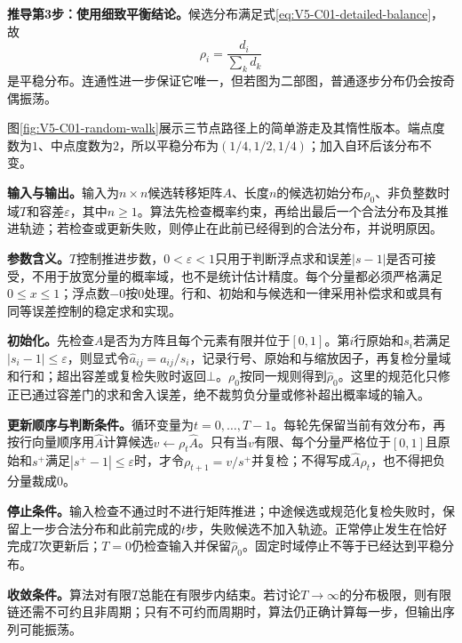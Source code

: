 \textbf{推导第3步：使用细致平衡结论。}候选分布满足式\eqref{eq:V5-C01-detailed-balance}，故
\begin{equation}\label{eq:V5-C01-degree-stationary}
\rho_i=\frac{d_i}{\sum_kd_k}
\end{equation}
是平稳分布。连通性进一步保证它唯一，但若图为二部图，普通逐步分布仍会按奇偶振荡。

图\ref{fig:V5-C01-random-walk}展示三节点路径上的简单游走及其惰性版本。端点度数为$1$、中点度数为$2$，所以平稳分布为$(1/4,\allowbreak 1/2,\allowbreak 1/4)$；加入自环后该分布不变。


\label{struct:V5-C01-CH19}
\label{struct:V5-C01-CH20}
\textbf{输入与输出。}输入为$n\times n$候选转移矩阵$A$、长度$n$的候选初始分布$\rho_0$、非负整数时域$T$和容差$\varepsilon$，其中$n\ge1$。算法先检查概率约束，再给出最后一个合法分布及其推进轨迹；若检查或更新失败，则停止在此前已经得到的合法分布，并说明原因。

\label{struct:V5-C01-CH21}
\textbf{参数含义。}$T$控制推进步数，$0<\varepsilon<1$只用于判断浮点求和误差$|s-1|$是否可接受，不用于放宽分量的概率域，也不是统计估计精度。每个分量都必须严格满足$0\le x\le1$；浮点数$-0$按$0$处理。行和、初始和与候选和一律采用补偿求和或具有同等误差控制的稳定求和实现。

\label{struct:V5-C01-CH22}
\textbf{初始化。}先检查$A$是否为方阵且每个元素有限并位于$[0,1]$。第$i$行原始和$s_i$若满足$|s_i-1|\le\varepsilon$，则显式令$\widehat a_{ij}=a_{ij}/s_i$，记录行号、原始和与缩放因子，再复检分量域和行和；超出容差或复检失败时返回$\bot$。$\rho_0$按同一规则得到$\widehat\rho_0$。这里的规范化只修正已通过容差门的求和舍入误差，绝不裁剪负分量或修补超出概率域的输入。

\label{struct:V5-C01-CH23}
\textbf{更新顺序与判断条件。}循环变量为$t=0,\ldots,T-1$。每轮先保留当前有效分布，再按行向量顺序用$\widehat A$计算候选$v\leftarrow\rho_t\widehat A$。只有当$v$有限、每个分量严格位于$[0,1]$且原始和$s^+$满足$|s^+-1|\le\varepsilon$时，才令$\rho_{t+1}=v/s^+$并复检；不得写成$\widehat A\rho_t$，也不得把负分量裁成$0$。

\label{struct:V5-C01-CH24}
\textbf{停止条件。}输入检查不通过时不进行矩阵推进；中途候选或规范化复检失败时，保留上一步合法分布和此前完成的$t$步，失败候选不加入轨迹。正常停止发生在恰好完成$T$次更新后；$T=0$仍检查输入并保留$\widehat\rho_0$。固定时域停止不等于已经达到平稳分布。

\label{struct:V5-C01-CH25}
\textbf{收敛条件。}算法对有限$T$总能在有限步内结束。若讨论$T\to\infty$的分布极限，则有限链还需不可约且非周期；只有不可约而周期时，算法仍正确计算每一步，但输出序列可能振荡。


